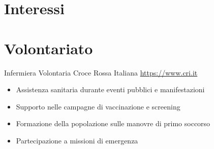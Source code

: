 \documentclass[a4paper, serif, 10pt]{moderncv}
\begin{document}
\section{Interessi}

\section{Volontariato}

        {Infermiera Volontaria}
        {Croce Rossa Italiana}
        {\url{https://www.cri.it}}
        {}
        {\begin{itemize}
\item Assistenza sanitaria durante eventi pubblici e manifestazioni
\item Supporto nelle campagne di vaccinazione e screening
\item Formazione della popolazione sulle manovre di primo soccorso
\item Partecipazione a missioni di emergenza
\end{itemize}}
    
\end{document}

